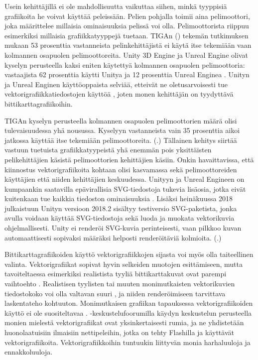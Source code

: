 \documentclass[utf8,bachelor]{gradu3}
\newcommand{\parencitedot}[1]{(\cite{#1}.)}
\begin{document}
Usein kehittäjillä ei ole mahdollisuutta vaikuttaa siihen, minkä tyyppisiä grafiikoita he voivat käyttää peleissään. Pelien pohjalla toimii aina pelimoottori, joka määrittelee millaisia ominaisuuksia pelissä voi olla. Pelimoottorista riippuu esimerkiksi millaisia grafiikkatyyppejä tuetaan. TIGAn (\citeyear{RefWorks:doc:5bf14747e4b09ed70a21a7e4}) tekemän tutkimuksen mukaan 53 prosenttia vastanneista pelinkehittäjistä ei käytä itse tekemiään vaan kolmannen osapuolen pelimoottoreita. Unity 3D Engine ja Unreal Engine olivat kyselyn perusteella kaksi eniten käytettyä kolmannen osapuolen pelimoottoria: vastaajista 62 prosenttia käytti Unitya ja 12 prosenttia Unreal Enginea \parencite{RefWorks:doc:5bf14747e4b09ed70a21a7e4}. Unityn ja Unreal Enginen käyttöoppaista selviää, etteivät ne oletusarvoisesti tue vektorigrafiikkatiedostojen käyttöä \parencites{RefWorks:doc:5bf1684be4b045abd3990077}{RefWorks:doc:5bf168ace4b0d4880bbec9aa}, joten monen kehittäjän on tyydyttävä bittikarttagrafiikoihin.

TIGAn kyselyn perusteella kolmannen osapuolen pelimoottorien määrä olisi tulevaisuudessa yhä nousussa. Kyselyyn vastanneista vain 35 prosenttia aikoi jatkossa käyttää itse tekemiään pelimoottoreita. \parencitedot{RefWorks:doc:5bf14747e4b09ed70a21a7e4} Tällainen kehitys siirtää vastuun tuetuista grafiikkatyypeistä yhä enemmän pois yksittäisten pelikehittäjien käsistä pelimoottorien kehittäjien käsiin. Onkin havaittavissa, että kiinnostus vektorigrafiikoita kohtaan olisi kasvamassa sekä pelimoottoreiden käyttäjien että niiden kehittäjien keskuudessa. Unityyn ja Unreal Engineen on kumpaankin saatavilla epävirallisia SVG-tiedostoja tukevia lisäosia, jotka eivät kuitenkaan tue kaikkia tiedoston ominaisuuksia \parencites{RefWorks:doc:5bf1712ce4b0efa59d30f4f7}{RefWorks:doc:5bf17193e4b09ed70a21ac25}. Lisäksi heinäkuussa 2018 julkaistuun Unityn versioon 2018.2 sisältyy testiversio SVG-paketista, jonka avulla voidaan käyttää SVG-tiedostoja sekä luoda ja muokata vektorikuvia ohjelmallisesti. Unity ei renderöi SVG-kuvia perinteisesti, vaan pilkkoo kuvan automaattisesti sopivaksi määräksi helposti renderöitäviä kolmioita. \parencitedot{RefWorks:doc:5c0153b7e4b0d07d385793b5}

Bittikarttagrafiikoiden käyttö vektorigrafiikkojen sijasta voi myös olla taiteellinen valinta. Vektorigrafiikat sopivat hyvin selkeiden muotojen esittämiseen, mutta tavoiteltaessa esimerkiksi realistista tyyliä bittikarttakuvat ovat parempi vaihtoehto \parencite{RefWorks:doc:5bdc5224e4b05afcfde5b159}. Realistisen tyylisten tai muuten monimutkaisten vektorikuvien tiedostokoko voi olla valtavan suuri \parencite{RefWorks:doc:5bdf4af9e4b0f02deeb8a48a}, ja niiden renderöimiseen tarvittava laskentateho kohtuuton. Monimutkaisen grafiikan tapauksessa vektorigrafiikoiden käyttö ei ole suositeltavaa \parencite{RefWorks:doc:5bdf4af9e4b0f02deeb8a48a}. \textcite{RefWorks:doc:5bf1b71ae4b0bdd1f93c0e3c} -keskustelufoorumilla käydyn keskustelun perusteella monien mielestä vektorigrafiikat ovat yksinkertaisesti rumia, ja ne yhdistetään huonolaatuisiin ilmaisiin nettipeleihin, jotka on tehty Flashilla ja käyttävät vektorigrafiikoita. Vektorigrafiikkoihin tuntuukin liittyvän monia harhaluuloja ja ennakkoluuloja.
\end{document}
